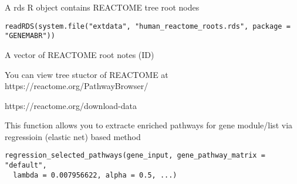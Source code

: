 \documentclass[a4paper]{book}
\begin{document}
%
\begin{Description}\relax
A rds R object contains REACTOME tree root nodes
\end{Description}
%
\begin{Usage}
\begin{verbatim}
readRDS(system.file("extdata", "human_reactome_roots.rds", package = "GENEMABR"))
\end{verbatim}
\end{Usage}
%
\begin{Format}
A vector of REACTOME root notes (ID)
\end{Format}
%
\begin{Details}\relax
You can view tree stuctor of REACTOME at https://reactome.org/PathwayBrowser/
\end{Details}
%
\begin{Source}\relax
https://reactome.org/download-data
\end{Source}
%
\begin{Description}\relax
This function allows you to extracte enriched pathways for gene module/list via regressioin (elastic net) based method
\end{Description}
%
\begin{Usage}
\begin{verbatim}
regression_selected_pathways(gene_input, gene_pathway_matrix = "default",
  lambda = 0.007956622, alpha = 0.5, ...)
\end{verbatim}
\end{Usage}
%
\end{document}
